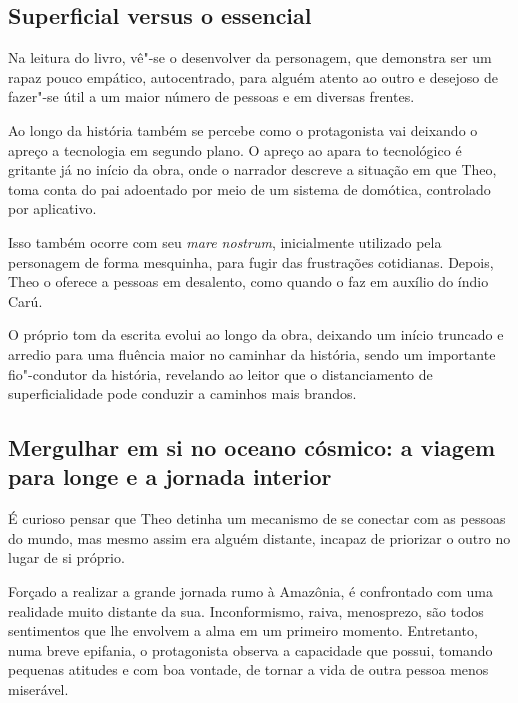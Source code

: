 \documentclass[12pt]{extarticle}
\begin{document}
\subsection{Superficial versus o essencial}
Na leitura do livro, vê"-se o desenvolver da personagem, que demonstra
ser um rapaz pouco empático, autocentrado, para alguém atento ao outro e
desejoso de fazer"-se útil a um maior número de pessoas e em
diversas frentes.

Ao longo da história também se percebe como o protagonista vai deixando
o apreço a tecnologia em segundo plano. O apreço ao apara to tecnológico é
gritante já no início da obra, onde o narrador descreve a situação em que
Theo, toma conta do pai adoentado por meio de um
sistema de domótica, controlado por aplicativo.

Isso também ocorre com seu \emph{mare nostrum}, inicialmente utilizado
pela personagem de forma mesquinha, para fugir das frustrações
cotidianas. Depois, Theo o oferece a pessoas em desalento, como quando o
faz em auxílio do índio Carú.

O próprio tom da escrita evolui ao longo da obra, deixando um início
truncado e arredio para uma fluência maior no caminhar da
história, sendo um importante fio"-condutor da história, revelando
ao leitor que o distanciamento de superficialidade pode conduzir a
caminhos mais brandos.


\subsection{Mergulhar em si no oceano cósmico: a viagem para longe e a
jornada interior}

É curioso pensar que Theo detinha um mecanismo de se conectar com as pessoas do mundo, mas mesmo assim era alguém distante, incapaz de priorizar o outro no lugar de si próprio.

Forçado a realizar a grande jornada rumo à Amazônia, é confrontado com
uma realidade muito distante da sua. Inconformismo, raiva, menosprezo,
são todos sentimentos que lhe envolvem a alma em um primeiro momento.
Entretanto, numa breve epifania, o
protagonista observa a capacidade que possui, tomando pequenas atitudes e com boa vontade, de
tornar a vida de outra pessoa menos miserável.
\end{document}
